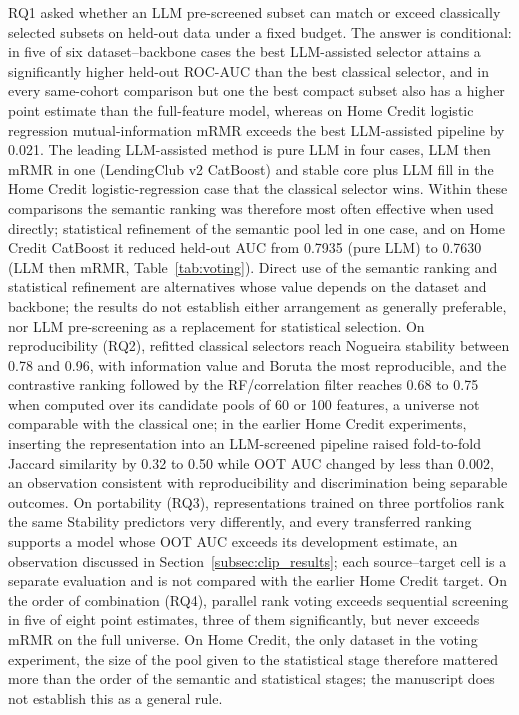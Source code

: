 \documentclass[final,5p,twocolumn]{elsarticle}
\begin{document}
RQ1 asked whether an LLM pre-screened subset can match or exceed classically selected subsets on held-out data under a fixed budget. The answer is conditional: in five of six dataset--backbone cases the best LLM-assisted selector attains a significantly higher held-out ROC-AUC than the best classical selector, and in every same-cohort comparison but one the best compact subset also has a higher point estimate than the full-feature model, whereas on Home Credit logistic regression mutual-information mRMR exceeds the best LLM-assisted pipeline by 0.021. The leading LLM-assisted method is pure LLM in four cases, LLM then mRMR in one (LendingClub v2 CatBoost) and stable core plus LLM fill in the Home Credit logistic-regression case that the classical selector wins. Within these comparisons the semantic ranking was therefore most often effective when used directly; statistical refinement of the semantic pool led in one case, and on Home Credit CatBoost it reduced held-out AUC from 0.7935 (pure LLM) to 0.7630 (LLM then mRMR, Table~\ref{tab:voting}). Direct use of the semantic ranking and statistical refinement are alternatives whose value depends on the dataset and backbone; the results do not establish either arrangement as generally preferable, nor LLM pre-screening as a replacement for statistical selection. On reproducibility (RQ2), refitted classical selectors reach Nogueira stability between 0.78 and 0.96, with information value and Boruta the most reproducible, and the contrastive ranking followed by the RF/correlation filter reaches 0.68 to 0.75 when computed over its candidate pools of 60 or 100 features, a universe not comparable with the classical one; in the earlier Home Credit experiments, inserting the representation into an LLM-screened pipeline raised fold-to-fold Jaccard similarity by 0.32 to 0.50 while OOT AUC changed by less than 0.002, an observation consistent with reproducibility and discrimination being separable outcomes. On portability (RQ3), representations trained on three portfolios rank the same Stability predictors very differently, and every transferred ranking supports a model whose OOT AUC exceeds its development estimate, an observation discussed in Section~\ref{subsec:clip_results}; each source--target cell is a separate evaluation and is not compared with the earlier Home Credit target. On the order of combination (RQ4), parallel rank voting exceeds sequential screening in five of eight point estimates, three of them significantly, but never exceeds mRMR on the full universe. On Home Credit, the only dataset in the voting experiment, the size of the pool given to the statistical stage therefore mattered more than the order of the semantic and statistical stages; the manuscript does not establish this as a general rule.
\end{document}
